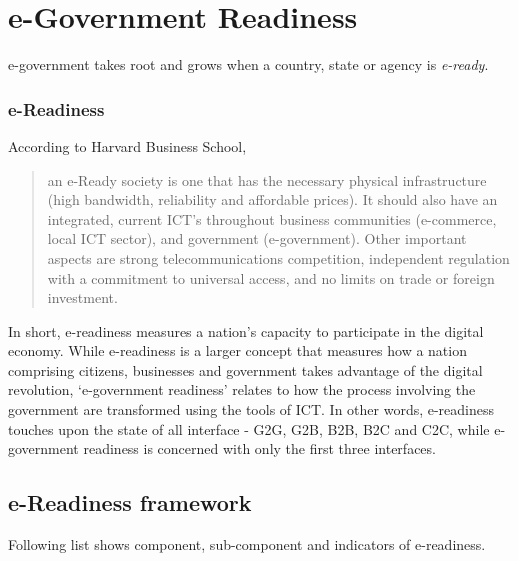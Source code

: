 \chapter{e-Government Readiness}
e-government takes root and grows when a country, state or agency is \textit{e-ready}.

\subsection*{e-Readiness}
According to Harvard Business School,
\begin{quotation}
	\noindent an e-Ready society is one that has the necessary physical infrastructure (high bandwidth, reliability and affordable prices). It should also have an integrated, current ICT's throughout business communities (e-commerce, local ICT sector), and government (e-government). Other important aspects are strong telecommunications competition, independent regulation with a commitment to universal access, and no limits on trade or foreign investment.
\end{quotation}


In short, e-readiness measures a nation's capacity to participate in the digital economy. While e-readiness is a larger concept that measures how a nation comprising citizens, businesses and government takes advantage of the digital revolution, `e-government readiness' relates to how the process involving the government are transformed using the tools of ICT. In other words, e-readiness touches upon the state of all interface - G2G, G2B, B2B, B2C and C2C, while e-government readiness is concerned with only the first three interfaces.


\section{e-Readiness framework}


Following list shows component, sub-component and indicators of e-readiness.


